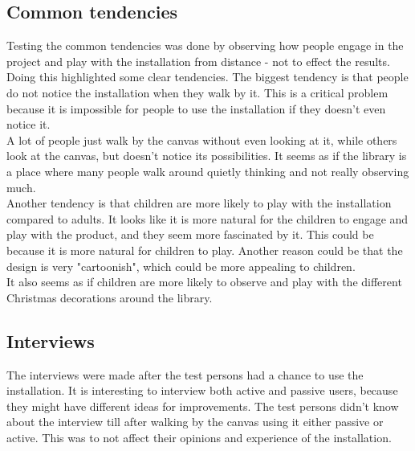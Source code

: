 \subsection{Common tendencies}
Testing the common tendencies was done by observing how people engage in the project and play with the installation from distance - not to effect the results.\\ 
Doing this highlighted some clear tendencies. The biggest tendency is that people do not notice the installation when they walk by it. This is a critical problem because it is impossible for people to use the installation if they doesn't even notice it.\\
A lot of people just walk by the canvas without even looking at it, while others look at the canvas, but doesn't notice its possibilities. It seems as if the library is a place where many people walk around quietly thinking and not really observing much.\\
Another tendency is that children are more likely to play with the installation compared to adults. It looks like it is more natural for the children to engage and play with the product, and they seem more fascinated by it. This could be because it is more natural for children to play. Another reason could be that the design is very "cartoonish", which could be more appealing to children.\\
It also seems as if children are more likely to observe and play with the different Christmas decorations around the library.

\subsection{Interviews}
The interviews were made after the test persons had a chance to use the installation. It is interesting to interview both active and passive users, because they might have different ideas for improvements. The test persons didn't know about the interview till after walking by the canvas using it either passive or active. This was to not affect their opinions and experience of the installation.

